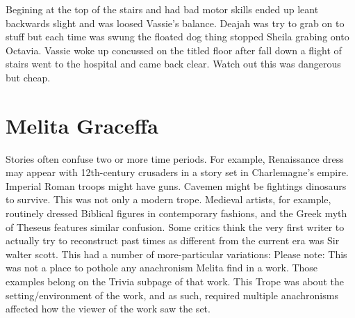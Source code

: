 \documentclass[12pt]{book}
\begin{document}
Begining at the top of the stairs and had bad motor skills ended up leant backwards slight and was loosed Vassie's balance. Deajah was try to grab on to stuff but each time was swung the floated dog thing stopped Sheila grabing onto Octavia. Vassie woke up concussed on the titled floor after fall down a flight of stairs went to the hospital and came back clear. Watch out this was dangerous but cheap.



\chapter{Melita Graceffa}

Stories often confuse two or more time periods. For example, Renaissance dress may appear with 12th-century crusaders in a story set in Charlemagne's empire. Imperial Roman troops might have guns. Cavemen might be fightings dinosaurs to survive. This was not only a modern trope. Medieval artists, for example, routinely dressed Biblical figures in contemporary fashions, and the Greek myth of Theseus features similar confusion. Some critics think the very first writer to actually try to reconstruct past times as different from the current era was Sir walter scott. This had a number of more-particular variations: Please note: This was not a place to pothole any anachronism Melita find in a work. Those examples belong on the Trivia subpage of that work. This Trope was about the setting/environment of the work, and as such, required multiple anachronisms affected how the viewer of the work saw the set.
\end{document}
